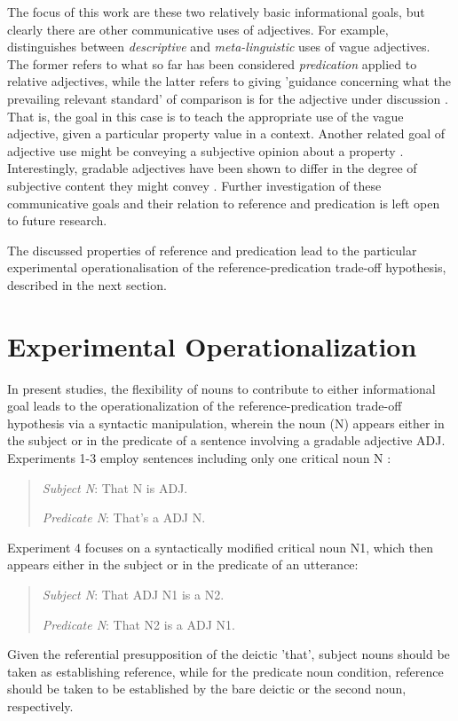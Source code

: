 The focus of this work are these two relatively basic informational goals, but clearly there are other communicative uses of adjectives. For example, \textcite{barker2002dynamics} distinguishes between \textit{descriptive} and \textit{meta-linguistic} uses of vague adjectives. The former refers to what so far has been considered \emph{predication} applied to relative adjectives, while the latter refers to giving 'guidance concerning what the prevailing relevant standard' of comparison is for the adjective under discussion \parencite[p. 2]{barker2002dynamics}. That is, the goal in this case is to teach the appropriate use of the vague adjective, given a particular property value in a context. Another related goal of adjective use might be conveying a subjective opinion about a property \parencite{kaiser2020}. Interestingly, gradable adjectives have been shown to differ in the degree of subjective content they might convey \parencite{scontras2017subjectivity}. Further investigation of these communicative goals and their relation to reference and predication is left open to future research.

The discussed properties of reference and predication lead to the particular experimental operationalisation of the reference-predication trade-off hypothesis, described in the next section. 

\section{Experimental Operationalization}
In present studies, the flexibility of nouns to contribute to either informational goal leads to the operationalization of the reference-predication trade-off hypothesis via a syntactic manipulation, wherein the noun (N) appears either in the subject or in the predicate of a sentence involving a gradable adjective ADJ. Experiments 1-3 employ sentences including only one critical noun N \parencite{tessler2020}:
\begin{quotation}
	\textit{Subject N}: That N is ADJ. 
	
	\textit{Predicate N}: That's a ADJ N.
\end{quotation}
Experiment 4 focuses on a syntactically modified critical noun N1, which then appears either in the subject or in the predicate of an utterance: 
\begin{quotation}
	\textit{Subject N}: That ADJ N1 is a N2. 
	 
	\textit{Predicate N}: That N2 is a ADJ N1.
\end{quotation} 
Given the referential presupposition of the deictic 'that', subject nouns should be taken as establishing reference, while for the predicate noun condition, reference should be taken to be established by the bare deictic or the second noun, respectively.


